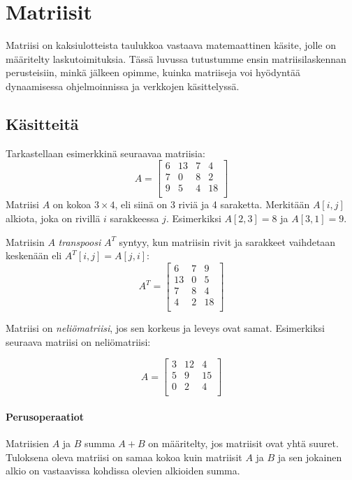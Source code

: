 \chapter{Matriisit}

Matriisi on kaksiulotteista taulukkoa
vastaava matemaattinen käsite,
jolle on määritelty laskutoimituksia.
Tässä luvussa tutustumme ensin matriisilaskennan
perusteisiin, minkä jälkeen opimme, kuinka
matriiseja voi hyödyntää dynaamisessa ohjelmoinnissa
ja verkkojen käsittelyssä.

\section{Käsitteitä}

Tarkastellaan esimerkkinä seuraavaa matriisia:
\[
A = 
 \begin{bmatrix}
  6 & 13 & 7 & 4 \\
  7 & 0 & 8 & 2 \\
  9 & 5 & 4 & 18 \\
 \end{bmatrix}
\]
Matriisi $A$ on kokoa $3 \times 4$,
eli siinä on 3 riviä ja 4 saraketta.
Merkitään $A[i,j]$ alkiota,
joka on rivillä $i$ sarakkeessa $j$.
Esimerkiksi $A[2,3]=8$ ja $A[3,1]=9$.

Matriisin $A$ \textit{transpoosi} $A^T$ syntyy,
kun matriisin rivit ja sarakkeet vaihdetaan
keskenään eli $A^T[i,j]=A[j,i]$:
\[
A^T = 
 \begin{bmatrix}
  6 & 7 & 9 \\
  13 & 0 & 5 \\
  7 & 8 & 4 \\
  4 & 2 & 18 \\
 \end{bmatrix}
\]

Matriisi on \textit{neliömatriisi}, jos sen
korkeus ja leveys ovat samat.
Esimerkiksi seuraava matriisi on neliömatriisi:

\[
A = 
 \begin{bmatrix}
  3 & 12 & 4  \\
  5 & 9 & 15  \\
  0 & 2 & 4 \\
 \end{bmatrix}
\]

\subsubsection{Perusoperaatiot}

Matriisien $A$ ja $B$ summa $A+B$ on määritelty,
jos matriisit ovat yhtä suuret.
Tuloksena oleva matriisi on
samaa kokoa kuin
matriisit $A$ ja $B$ ja sen jokainen
alkio on vastaavissa kohdissa
olevien alkioiden summa.

